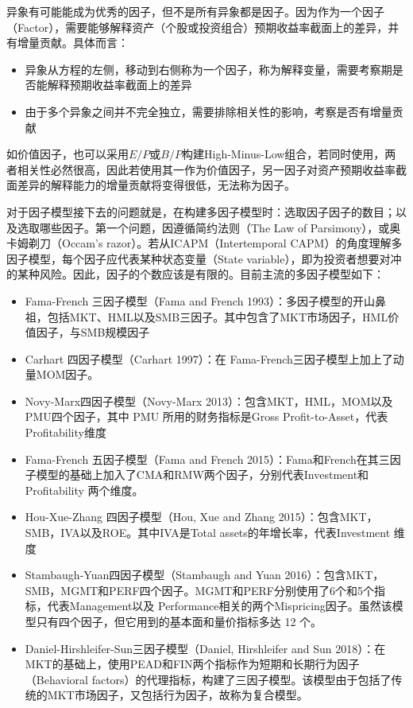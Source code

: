 \documentclass[11pt]{article}
\begin{document}
异象有可能能成为优秀的因子，但不是所有异象都是因子。因为作为一个因子（Factor），需要能够解释资产（个股或投资组合）预期收益率截面上的差异，并有增量贡献。具体而言：
\begin{itemize}
    \item 异象从方程的左侧，移动到右侧称为一个因子，称为解释变量，需要考察期是否能解释预期收益率截面上的差异
    \item 由于多个异象之间并不完全独立，需要排除相关性的影响，考察是否有增量贡献
\end{itemize}

如价值因子，也可以采用$E/P$或$B/P$构建High-Minus-Low组合，若同时使用，两者相关性必然很高，因此若使用其一作为价值因子，另一因子对资产预期收益率截面差异的解释能力的增量贡献将变得很低，无法称为因子。

对于因子模型接下去的问题就是，在构建多因子模型时：选取因子因子的数目；以及选取哪些因子。第一个问题，因遵循简约法则（The Law of Parsimony），或奥卡姆剃刀（Occam's razor）。若从ICAPM（Intertemporal CAPM）的角度理解多因子模型，每个因子应代表某种状态变量（State variable），即为投资者想要对冲的某种风险。因此，因子的个数应该是有限的。目前主流的多因子模型如下：
\begin{itemize}
    \item Fama-French 三因子模型（Fama and French 1993）：多因子模型的开山鼻祖，包括MKT、HML以及SMB三因子。其中包含了MKT市场因子，HML价值因子，与SMB规模因子
    \item Carhart 四因子模型（Carhart 1997）：在 Fama-French三因子模型上加上了动量MOM因子。
    \item Novy-Marx四因子模型（Novy-Marx 2013）：包含MKT，HML，MOM以及PMU四个因子，其中 PMU 所用的财务指标是Gross Profit-to-Asset，代表Profitability维度
    \item Fama-French 五因子模型（Fama and French 2015）：Fama和French在其三因子模型的基础上加入了CMA和RMW两个因子，分别代表Investment和Profitability 两个维度。
    \item Hou-Xue-Zhang 四因子模型（Hou, Xue and Zhang 2015）：包含MKT，SMB，IVA以及ROE。其中IVA是Total assets的年增长率，代表Investment 维度
    \item Stambaugh-Yuan四因子模型（Stambaugh and Yuan 2016）：包含MKT，SMB，MGMT和PERF四个因子。MGMT和PERF分别使用了6个和5个指标，代表Management以及 Performance相关的两个Mispricing因子。虽然该模型只有四个因子，但它用到的基本面和量价指标多达 12 个。
    \item Daniel-Hirshleifer-Sun三因子模型（Daniel, Hirshleifer and Sun 2018）：在MKT的基础上，使用PEAD和FIN两个指标作为短期和长期行为因子（Behavioral factors）的代理指标，构建了三因子模型。该模型由于包括了传统的MKT市场因子，又包括行为因子，故称为复合模型。
\end{itemize}
\end{document}
